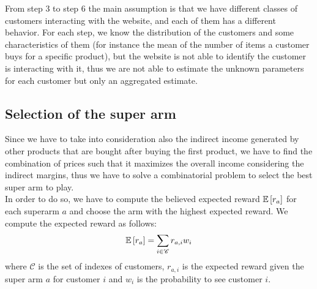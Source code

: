 From step 3 to step 6 the main assumption is that we have different classes of customers interacting with the website, and each of them has a different behavior. For each step, we know the distribution of the customers and some characteristics of them (for instance the mean of the number of items a customer buys for a specific product), but the website is not able to identify the customer is interacting with it, thus we are not able to estimate the unknown parameters for each customer but only an aggregated estimate.

\subsection{Selection of the super arm}
Since we have to take into consideration also the indirect income generated by other products that are bought after buying the first product, we have to find the combination of prices such that it maximizes the overall income considering the indirect margins, thus we have to solve a combinatorial problem to select the best super arm to play.\\
In order to do so, we have to compute the believed expected reward $\operatorname{\mathbb{E}}\left[ r_a\right]$ for each superarm $a$ and choose the arm with the highest expected reward. We compute the expected reward as follows:
\begin{align*}
    \operatorname{\mathbb{E}}\left[ r_a\right] = \sum_{i \in \mathcal{C}} r_{a,i} w_i
\end{align*}
where $\mathcal{C}$ is the set of indexes of customers, $r_{a,i}$ is the expected reward given the super arm $a$ for customer $i$ and $w_i$ is the probability to see customer $i$.\\
